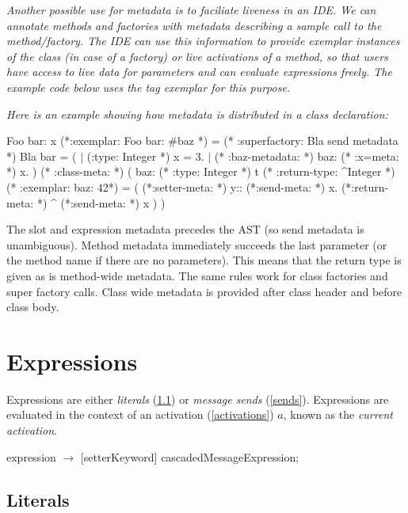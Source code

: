 \documentclass{article}
\begin{document}
{\it
Another possible  use for metadata is to faciliate liveness in an IDE.  We can annotate methods and factories with metadata describing a sample call to the method/factory. The IDE can use this information to provide exemplar instances of the class (in case of a factory) or live activations of a method, so that users have access to live data for parameters and can evaluate expressions freely.
The example code below uses the tag {\em exemplar} for this purpose.
}

{\it
Here is an example showing how metadata is distributed in a class declaration:
\newline
\begin{newspeak}
\CLASS{} Foo bar: x (*:exemplar:  Foo bar: \#baz *) = (* :superfactory: Bla send metadata *) Bla bar = ( 
   $|$ (:type: Integer *) x = 3. $|$    
  (* :baz-metadata: *) baz:  (* :x=meta: *) x.   
) (* :class-meta: *) (   
    baz: (* :type: Integer *) t (* :return-type: \^{}Integer *) (* :exemplar:  baz: 42*) = ( 
       (*:setter-meta: *) y:: (*:send-meta: *) x.       
       (*:return-meta: *) \^{} (*:send-meta: *) x    
    ) 
)
\end{newspeak}

The slot and expression metadata precedes the AST (so send metadata is unambiguous).
Method metadata immediately succeeds the last parameter (or the method name if there are no parameters). This means that the return type is given as is method-wide metadata. The same rules work for class factories and super factory calls. Class wide metadata is provided after class header and before class body.
}

\section{Expressions}
\label{expression}

Expressions are either {\em literals} (\ref{literals}) or {\em message sends} (\ref{sends}). Expressions are evaluated in the context of an activation (\ref{activations}) $a$, known as the {\em current activation}.

\begin{newspeak}
expression $\rightarrow$ [setterKeyword] cascadedMessageExpression;
\end{newspeak}

\subsection{Literals}
\label{literals}
\end{document}
